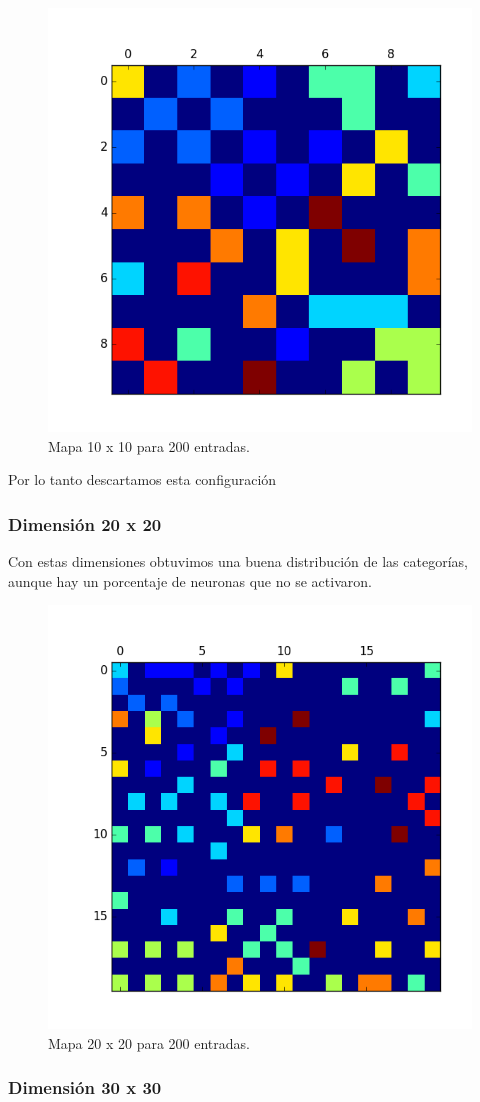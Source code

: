 \begin{figure}[H]
  \centering
  \includegraphics[width=0.5\columnwidth]{secciones/graficos/kohonen/mapa1010.png}
  \caption{Mapa 10 x 10 para 200 entradas.}
  \label{fig:mapa 10 10 200}
\end{figure}


Por lo tanto descartamos esta configuración

\subsubsection{Dimensión 20 x 20 }

Con estas dimensiones obtuvimos una buena distribución de las categorías,
aunque hay un porcentaje de neuronas que no se activaron.

\begin{figure}[H]
  \centering
  \includegraphics[width=0.5\columnwidth]{secciones/graficos/kohonen/mapa2020.png}
  \caption{Mapa 20 x 20 para 200 entradas.}
  \label{fig:mapa 20 20 200}
\end{figure}


\subsubsection{Dimensión 30 x 30 }

